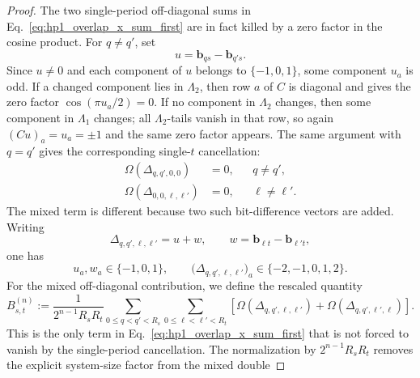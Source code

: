 \begin{proof}
The two single-period off-diagonal sums in
Eq.~\eqref{eq:hp1_overlap_x_sum_first} are in fact killed by a zero factor in
the cosine product.  For \(q\ne q'\), set
\begin{equation}
    u
    =
    \mathbf b_{qs}-\mathbf b_{q's}.
    \label{eq:hp1_single_s_difference_vector}
\end{equation}
Since \(u\ne0\) and each component of \(u\) belongs to \(\{-1,0,1\}\), some
component \(u_a\) is odd.  If a changed component lies in \(\Lambda_2\), then
row \(a\) of \(C\) is diagonal and gives the zero factor
\(\cos(\pi u_a/2)=0\).  If no component in \(\Lambda_2\) changes, then some
component in \(\Lambda_1\) changes; all \(\Lambda_2\)-tails vanish in that row,
so again \((Cu)_a=u_a=\pm1\) and the same zero factor appears.  The same
argument with \(q=q'\) gives the corresponding single-\(t\) cancellation:
\begin{equation}
    \begin{aligned}
    \Omega\!\left(\Delta_{q,q',0,0}\right)&=0,
    && q\ne q',\\
    \Omega\!\left(\Delta_{0,0,\ell,\ell'}\right)&=0,
    && \ell\ne\ell'.
    \end{aligned}
    \label{eq:hp1_single_omega_vanishes}
\end{equation}
The mixed term is different because two such bit-difference vectors are added.
Writing
\begin{equation}
    \Delta_{q,q',\ell,\ell'}
    =
    u+w,
    \qquad
    w=\mathbf b_{\ell t}-\mathbf b_{\ell't},
    \label{eq:hp1_mixed_difference_sum}
\end{equation}
one has
\begin{equation}
    u_a,w_a\in\{-1,0,1\},
    \qquad
    \bigl(\Delta_{q,q',\ell,\ell'}\bigr)_a
    \in\{-2,-1,0,1,2\}.
    \label{eq:hp1_mixed_difference_components}
\end{equation}
For the mixed off-diagonal contribution, we define the rescaled quantity
\begin{equation}
    B_{s,t}^{(n)}
    :=
    \frac{1}{2^{n-1}R_sR_t}
    \sum_{0\le q<q'<R_s}
    \sum_{0\le \ell<\ell'<R_t}
    \left[
        \Omega\!\left(\Delta_{q,q',\ell,\ell'}\right)
        +
        \Omega\!\left(\Delta_{q,q',\ell',\ell}\right)
    \right].
    \label{eq:hp1_mixed_B_definition}
\end{equation}
This is the only term in Eq.~\eqref{eq:hp1_overlap_x_sum_first} that is not
forced to vanish by the single-period cancellation.  The normalization by
\(2^{n-1}R_sR_t\) removes the explicit system-size factor from the mixed double

\end{proof}
